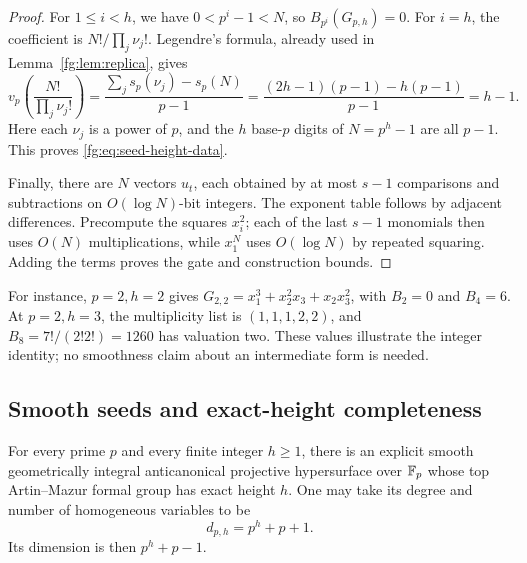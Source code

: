 \begin{proof}
For $1\le i<h$, we have $0<p^i-1<N$, so
$B_{p^i}(G_{p,h})=0$. For $i=h$, the coefficient is
$N!/\prod_j\nu_j!$. Legendre's formula, already used in
Lemma~\ref{fg:lem:replica}, gives
\[
 v_p\left(\frac{N!}{\prod_j\nu_j!}\right)
 =\frac{\sum_j s_p(\nu_j)-s_p(N)}{p-1}
 =\frac{(2h-1)(p-1)-h(p-1)}{p-1}=h-1.
\]
Here each $\nu_j$ is a power of $p$, and the $h$ base-$p$ digits of
$N=p^h-1$ are all $p-1$. This proves
\eqref{fg:eq:seed-height-data}.

Finally, there are $N$ vectors $u_t$, each obtained by at most
$s-1$ comparisons and subtractions on $O(\log N)$-bit integers.
The exponent table follows by adjacent differences. Precompute the
squares $x_i^2$; each of the last $s-1$ monomials then uses $O(N)$
multiplications, while $x_1^N$ uses $O(\log N)$ by repeated squaring.
Adding the terms proves the gate and construction bounds.
\end{proof}

For instance, $p=2,h=2$ gives
$G_{2,2}=x_1^3+x_2^2x_3+x_2x_3^2$, with $B_2=0$ and $B_4=6$.
At $p=2,h=3$, the multiplicity list is $(1,1,1,2,2)$, and
$B_8=7!/(2!2!)=1260$ has valuation two. These values illustrate the
integer identity; no smoothness claim about an intermediate form is
needed.

\subsection{Smooth seeds and exact-height completeness}
\begin{theorem}
\label{fg:thm:all-heights}
For every prime $p$ and every finite integer $h\ge1$, there is an
explicit smooth geometrically integral anticanonical projective
hypersurface over $\mathbb F_p$ whose top Artin--Mazur formal group has exact
height $h$. One may take its degree and number of homogeneous
variables to be
\begin{equation}\label{fg:eq:smooth-seed-size}
 d_{p,h}=p^h+p+1.
\end{equation}
Its dimension is then $p^h+p-1$.
\end{theorem}

